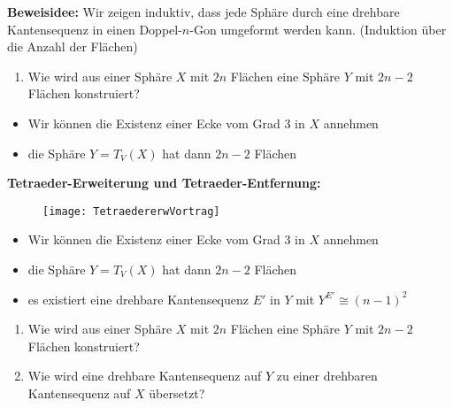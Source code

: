 \documentclass{beamer}
\begin{document}
\begin{frame}
\textbf{Beweisidee:} Wir zeigen induktiv, dass jede Sphäre durch eine drehbare Kantensequenz in einen Doppel-$n$-Gon umgeformt werden kann. \pause (Induktion über die Anzahl der Flächen)
\end{frame}
\begin{frame}
\begin{enumerate}
\item Wie wird aus einer Sphäre $X$ mit $2n$ Flächen eine Sphäre $Y$ mit $2n-2$ Flächen konstruiert?
\end{enumerate}
\end{frame}
\begin{frame}
\begin{itemize}
\item Wir können die Existenz einer Ecke vom Grad 3 in $X$ annehmen\pause
\item die Sphäre $Y=T_V(X)$ hat dann $2n-2$ Flächen
\end{itemize}
\end{frame}
\begin{frame}
\textbf{Tetraeder-Erweiterung und Tetraeder-Entfernung:}
\begin{figure}[H]
\begin{center}
\texttt{[image: TetraedererwVortrag]}
\end{center}
\end{figure}
\end{frame}
\begin{frame}
\begin{itemize}
\item Wir können die Existenz einer Ecke vom Grad 3 in $X$ annehmen\pause
\item die Sphäre $Y=T_V(X)$ hat dann $2n-2$ Flächen\pause
\item es existiert eine drehbare Kantensequenz $E'$ in $Y$ mit $Y^{E'}\cong (n-1)^2$  
\end{itemize}
\end{frame}
\begin{frame}
\begin{enumerate}
\item Wie wird aus einer Sphäre $X$ mit $2n$ Flächen eine Sphäre $Y$ mit $2n-2$ Flächen konstruiert?
\item Wie wird eine drehbare Kantensequenz auf $Y$ zu einer drehbaren Kantensequenz auf $X$ übersetzt? 
\end{enumerate}
\end{frame}
\end{document}
